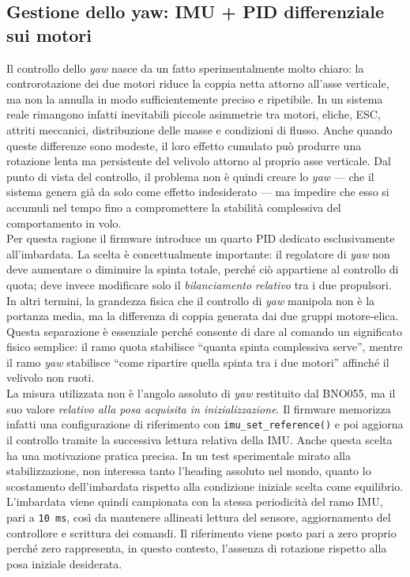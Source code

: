 \documentclass[11pt]{report}
\begin{document}
	

	\subsection{Gestione dello yaw: IMU + PID differenziale sui motori}
	Il controllo dello \textit{yaw} nasce da un fatto sperimentalmente molto chiaro: la controrotazione dei due motori riduce la coppia netta attorno all'asse verticale, ma non la annulla in modo sufficientemente preciso e ripetibile. In un sistema reale rimangono infatti inevitabili piccole asimmetrie tra motori, eliche, ESC, attriti meccanici, distribuzione delle masse e condizioni di flusso. Anche quando queste differenze sono modeste, il loro effetto cumulato può produrre una rotazione lenta ma persistente del velivolo attorno al proprio asse verticale. Dal punto di vista del controllo, il problema non è quindi creare lo \textit{yaw} --- che il sistema genera già da solo come effetto indesiderato --- ma impedire che esso si accumuli nel tempo fino a compromettere la stabilità complessiva del comportamento in volo.\\
	Per questa ragione il firmware introduce un quarto PID dedicato esclusivamente all'imbardata. La scelta è concettualmente importante: il regolatore di \textit{yaw} non deve aumentare o diminuire la spinta totale, perché ciò appartiene al controllo di quota; deve invece modificare solo il \emph{bilanciamento relativo} tra i due propulsori. In altri termini, la grandezza fisica che il controllo di \textit{yaw} manipola non è la portanza media, ma la differenza di coppia generata dai due gruppi motore-elica. Questa separazione è essenziale perché consente di dare al comando un significato fisico semplice: il ramo quota stabilisce ``quanta spinta complessiva serve'', mentre il ramo \textit{yaw} stabilisce ``come ripartire quella spinta tra i due motori'' affinché il velivolo non ruoti.\\
	La misura utilizzata non è l'angolo assoluto di \textit{yaw} restituito dal BNO055, ma il suo valore \emph{relativo alla posa acquisita in inizializzazione}. Il firmware memorizza infatti una configurazione di riferimento con \texttt{imu\_set\_reference()} e poi aggiorna il controllo tramite la successiva lettura relativa della IMU. Anche questa scelta ha una motivazione pratica precisa. In un test sperimentale mirato alla stabilizzazione, non interessa tanto l'heading assoluto nel mondo, quanto lo scostamento dell'imbardata rispetto alla condizione iniziale scelta come equilibrio. L'imbardata viene quindi campionata con la stessa periodicità del ramo IMU, pari a \texttt{10 ms}, così da mantenere allineati lettura del sensore, aggiornamento del controllore e scrittura dei comandi. Il riferimento viene posto pari a zero proprio perché zero rappresenta, in questo contesto, l'assenza di rotazione rispetto alla posa iniziale desiderata.\\
\end{document}
